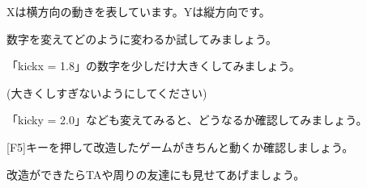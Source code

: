 Xは横方向の動きを表しています。Yは縦方向です。

数字を変えてどのように変わるか試してみましょう。


\begin{description}
    \item {}
\end{description}



「kickx = 1.8」の数字を少しだけ大きくしてみましょう。

(大きくしすぎないようにしてください)

「kicky = 2.0」なども変えてみると、どうなるか確認してみましょう。



[F5]キーを押して改造したゲームがきちんと動くか確認しましょう。

改造ができたらTAや周りの友達にも見せてあげましょう。


